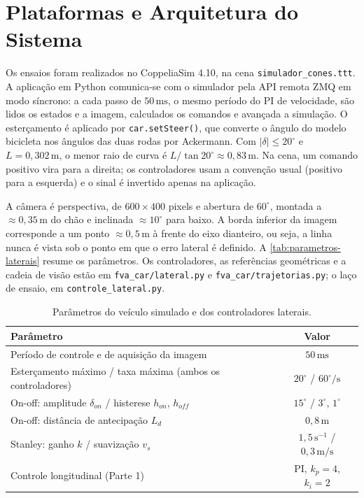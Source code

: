 \section{Plataformas e Arquitetura do Sistema}\label{sec:arquitetura}

Os ensaios foram realizados no CoppeliaSim 4.10, na cena \texttt{simulador\_cones.ttt}. A aplicação em Python comunica-se com o simulador pela API remota ZMQ em modo síncrono: a cada passo de $50\,\mathrm{ms}$, o mesmo período do PI de velocidade, são lidos os estados e a imagem, calculados os comandos e avançada a simulação. O esterçamento é aplicado por \texttt{car.setSteer()}, que converte o ângulo do modelo bicicleta nos ângulos das duas rodas por Ackermann. Com $|\delta|\le20^\circ$ e $L=0{,}302\,\mathrm{m}$, o menor raio de curva é $L/\tan20^\circ\approx0{,}83\,\mathrm{m}$. Na cena, um comando positivo vira para a direita; os controladores usam a convenção usual (positivo para a esquerda) e o sinal é invertido apenas na aplicação.

A câmera é perspectiva, de $600\times400$ pixels e abertura de $60^\circ$, montada a $\approx0{,}35\,\mathrm{m}$ do chão e inclinada $\approx10^\circ$ para baixo. A borda inferior da imagem corresponde a um ponto $\approx0{,}5\,\mathrm{m}$ à frente do eixo dianteiro, ou seja, a linha nunca é vista sob o ponto em que o erro lateral é definido. A \autoref{tab:parametros-laterais} resume os parâmetros. Os controladores, as referências geométricas e a cadeia de visão estão em \texttt{fva\_car/lateral.py} e \texttt{fva\_car/trajetorias.py}; o laço de ensaio, em \texttt{controle\_lateral.py}.

\begin{table}[ht]
    \centering
    \caption{Parâmetros do veículo simulado e dos controladores laterais.}
    \label{tab:parametros-laterais}
    \small
    \begin{tabular}{lc}
        \hline
        Parâmetro & Valor \\
        \hline
        Período de controle e de aquisição da imagem & $50\,\mathrm{ms}$ \\
        Esterçamento máximo / taxa máxima (ambos os controladores) & $20^\circ$ / $60^\circ/\mathrm{s}$ \\
        On-off: amplitude $\delta_{on}$ / histerese $h_{on}$, $h_{off}$ & $15^\circ$ / $3^\circ$, $1^\circ$ \\
        On-off: distância de antecipação $L_d$ & $0{,}8\,\mathrm{m}$ \\
        Stanley: ganho $k$ / suavização $v_s$ & $1{,}5\,\mathrm{s^{-1}}$ / $0{,}3\,\mathrm{m/s}$ \\
        Controle longitudinal (Parte 1) & PI, $k_p=4$, $k_i=2$ \\
        \hline
    \end{tabular}
\end{table}
